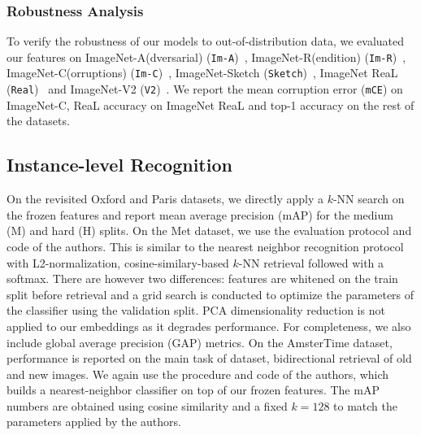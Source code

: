 \subsubsection{Robustness Analysis}
To verify the robustness of our models to out-of-distribution data,
we evaluated our features on ImageNet-A(dversarial) (\texttt{Im-A})~\cite{hendrycks2021natural}, ImageNet-R(endition) (\texttt{Im-R})~\cite{hendrycks2021many},
ImageNet-C(orruptions) (\texttt{Im-C})~\cite{hendrycks2018benchmarking},
ImageNet-Sketch (\texttt{Sketch})~\cite{wang2019learningrobust},
ImageNet ReaL (\texttt{Real})~\cite{beyer2020imagenetreal} and
ImageNet-V2 (\texttt{V2})~\cite{recht2019imagenetv2}. 
We report the mean corruption error (\texttt{mCE}) on ImageNet-C, ReaL accuracy on ImageNet ReaL and top-1 accuracy on the rest of the datasets. 



\subsection{Instance-level Recognition}
On the revisited Oxford and Paris datasets, we directly apply a $k$-NN search on the frozen features and report mean average precision (mAP) for the medium (M) and hard (H) splits. 
On the Met dataset, we use the evaluation protocol and code of the authors. 
This is similar to the nearest neighbor recognition protocol with L2-normalization, cosine-similary-based $k$-NN retrieval followed with a softmax. 
There are however two differences: features are whitened on the train split before retrieval and a grid search is conducted to optimize the parameters of the classifier using the validation split. 
PCA dimensionality reduction is not applied to our embeddings as it degrades performance. 
For completeness, we also include global average precision (GAP) metrics. 
On the AmsterTime dataset, performance is reported on the main task of dataset, bidirectional retrieval of old and new images. 
We again use the procedure and code of the authors, which builds a nearest-neighbor classifier on top of our frozen features. 
The mAP numbers are obtained using cosine similarity and a fixed $k = 128$ to match the parameters applied by the authors.



